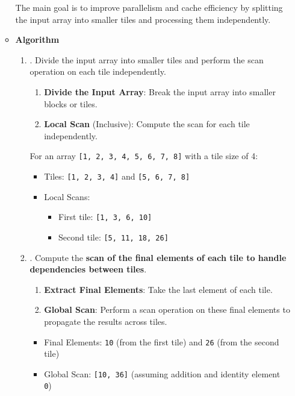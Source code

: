 \begin{itemize}
\begin{itemize}
        The main goal is to improve parallelism and cache efficiency by splitting the input array into smaller tiles and processing them independently.

        \item[\textcolor{Green3}{\faIcon{tools}}] \textcolor{Green3}{\textbf{Algorithm}}
        \begin{enumerate}
            \item {}. Divide the input array into smaller tiles and perform the scan operation on each tile independently.
            \begin{enumerate}
                \item \textbf{Divide the Input Array}: Break the input array into smaller blocks or tiles.
                \item \textbf{Local Scan} (Inclusive): Compute the scan for each tile independently.
            \end{enumerate}
            \begin{examplebox}
                For an array \texttt{[1, 2, 3, 4, 5, 6, 7, 8]} with a tile size of 4:
                \begin{itemize}
                    \item Tiles: \texttt{[1, 2, 3, 4]} and \texttt{[5, 6, 7, 8]}
                    \item Local Scans:
                    \begin{itemize}
                        \item First tile: \texttt{[1, 3, 6, 10]}
                        \item Second tile: \texttt{[5, 11, 18, 26]}
                    \end{itemize}
                \end{itemize}
            \end{examplebox}

            \item {}. Compute the \textbf{scan of the final elements of each tile to handle dependencies between tiles}.
            \begin{enumerate}
                \item \textbf{Extract Final Elements}: Take the last element of each tile.
                \item \textbf{Global Scan}: Perform a scan operation on these final elements to propagate the results across tiles.
            \end{enumerate}
            \begin{examplebox}
                \begin{itemize}
                    \item Final Elements: \texttt{10} (from the first tile) and \texttt{26} (from the second tile)
                    \item Global Scan: \texttt{[10, 36]} (assuming addition and identity element \texttt{0})
                \end{itemize}
            \end{examplebox}


\end{enumerate}
\end{itemize}
\end{itemize}
